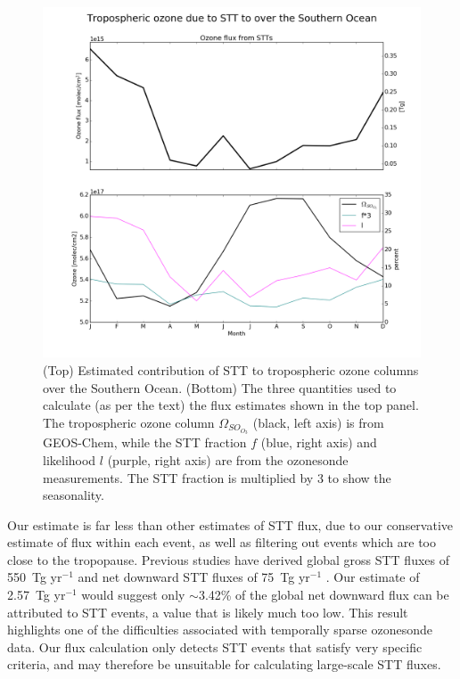 \documentclass{article}
\begin{document}
  \begin{figure}[!htbp]
    \includegraphics[width=\textwidth]{figures/SO_extrapolation.png}
    \caption{(Top) Estimated contribution of STT to tropospheric ozone columns over the Southern Ocean.
      (Bottom) The three quantities used to calculate (as per the text) the flux estimates shown in the top panel.
      The tropospheric ozone column $\Omega_{SO_{O_3}}$ (black, left axis) is from GEOS-Chem, while the STT fraction $f$ (blue, right axis) and likelihood $l$ (purple, right axis) are from the ozonesonde measurements.
      The STT fraction is multiplied by 3 to show the seasonality.}
    \label{fig:SOExtrapolation}
  \end{figure}
  
  Our estimate is far less than other estimates of STT flux, due to our conservative estimate of flux within each event, as well as filtering out events which are too close to the tropopause.
  Previous studies have derived global gross STT fluxes of 550~Tg yr$^{-1}$ \citep{Stevenson2006} and net downward STT fluxes of 75~Tg yr$^{-1}$ \citep{Sprenger2003}.
  Our estimate of 2.57~Tg yr$^{-1}$ would suggest only $\sim$3.42\% of the global net downward flux can be attributed to STT events, a value that is likely much too low.
  This result highlights one of the difficulties associated with temporally sparse ozonesonde data.
  Our flux calculation only detects STT events that satisfy very specific criteria, and may therefore be unsuitable for calculating large-scale STT fluxes.
  
\end{document}
